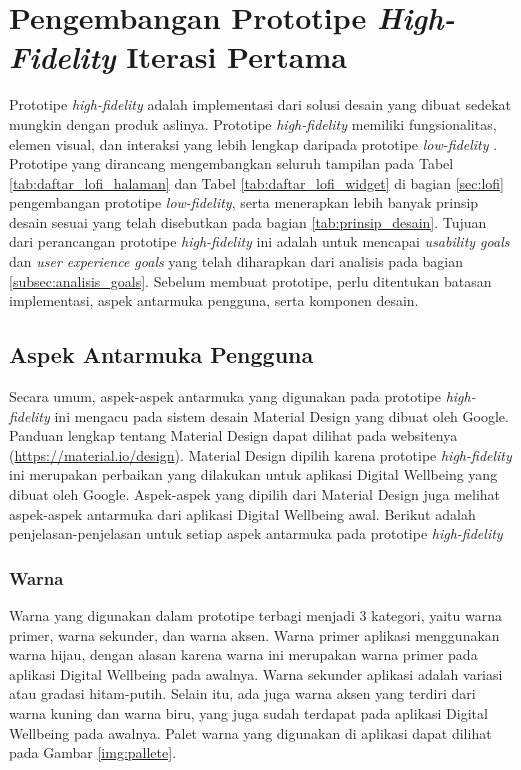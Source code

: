 
\section{Pengembangan Prototipe \textit{High-Fidelity} Iterasi Pertama}
\label{sec:hifi_1}

Prototipe \textit{high-fidelity} adalah implementasi dari solusi desain yang dibuat sedekat mungkin dengan produk aslinya. Prototipe \textit{high-fidelity} memiliki fungsionalitas, elemen visual, dan interaksi yang lebih lengkap daripada prototipe \textit{low-fidelity} \parencite{PreeceRogersSharp15}. Prototipe yang dirancang mengembangkan seluruh tampilan pada Tabel \ref{tab:daftar_lofi_halaman} dan Tabel \ref{tab:daftar_lofi_widget} di bagian \ref{sec:lofi} pengembangan prototipe \textit{low-fidelity}, serta menerapkan lebih banyak prinsip desain sesuai yang telah disebutkan pada bagian \ref{tab:prinsip_desain}. Tujuan dari perancangan prototipe \textit{high-fidelity} ini adalah untuk mencapai \textit{usability goals} dan \textit{user experience goals} yang telah diharapkan dari analisis pada bagian \ref{subsec:analisis_goals}. Sebelum membuat prototipe, perlu ditentukan batasan implementasi, aspek antarmuka pengguna, serta komponen desain.


\subsection{Aspek Antarmuka Pengguna}
\label{subsec:hifi_1_antarmuka}

Secara umum, aspek-aspek antarmuka yang digunakan pada prototipe \textit{high-fidelity} ini mengacu pada sistem desain Material Design yang dibuat oleh Google. Panduan lengkap tentang Material Design dapat dilihat pada websitenya (\href{https://material.io/design}{https://material.io/design}). Material Design dipilih karena prototipe \textit{high-fidelity} ini merupakan perbaikan yang dilakukan untuk aplikasi Digital Wellbeing yang dibuat oleh Google. Aspek-aspek yang dipilih dari Material Design juga melihat aspek-aspek antarmuka dari aplikasi Digital Wellbeing awal. Berikut adalah penjelasan-penjelasan untuk setiap aspek antarmuka pada prototipe \textit{high-fidelity}  

\subsubsection{Warna}
\label{subsubsec:aspek_warna}
Warna yang digunakan dalam prototipe terbagi menjadi 3 kategori, yaitu warna primer, warna sekunder, dan warna aksen. Warna primer aplikasi menggunakan warna hijau, dengan alasan karena warna ini merupakan warna primer pada aplikasi Digital Wellbeing pada awalnya. Warna sekunder aplikasi adalah variasi atau gradasi hitam-putih. Selain itu, ada juga warna aksen yang terdiri dari warna kuning dan warna biru, yang juga sudah terdapat pada aplikasi Digital Wellbeing pada awalnya. Palet warna yang digunakan di aplikasi dapat dilihat pada Gambar \ref{img:pallete}.

